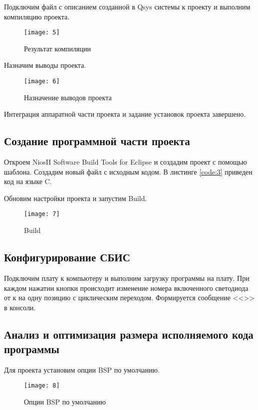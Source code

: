 Подключим файл с описанием созданной в Qsys системы к проекту и выполним компиляцию проекта.
\begin{figure}[H]
	\centering
	\texttt{[image: 5]}
	\caption{Результат компиляции}
\end{figure}

Назначим выводы проекта.
\begin{figure}[H]
	\centering
	\texttt{[image: 6]}
	\caption{Назначение выводов проекта}
\end{figure}

Интеграция аппаратной части проекта и задание установок проекта завершено.

\subsection{Создание программной части проекта}

Откроем NiosII Software Build Tools for Eclipse и создадим проект с помощью шаблона. Создадим новый файл с исходным кодом. В листинге \ref{code:3} приведен код на языке C.
\newpage


Обновим настройки проекта и запустим Build.
\begin{figure}[H]
	\centering
	\texttt{[image: 7]}
	\caption{Build}
\end{figure}

\subsection{Конфигурирование СБИС}

Подключим плату к компьютеру и выполним загрузку программы на плату. При каждом нажатии кнопки  происходит изменение номера включенного светодиода от  к  на одну позицию с циклическим переходом. Формируется сообщение <<>> в консоли.

\subsection{Анализ и оптимизация размера исполняемого кода программы}

Для проекта  установим опции BSP по умолчанию.
\begin{figure}[H]
	\centering
	\texttt{[image: 8]}
	\caption{Опции BSP по умолчанию}
\end{figure}

